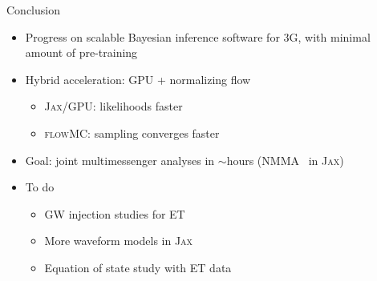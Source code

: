 \documentclass[usenames,dvipsnames,t]{beamer}
\begin{document}
\begin{frame}{Conclusion}
  \def\x{3mm}
  \def\y{2mm}

  \begin{itemize}
    \item Progress on scalable Bayesian inference software for 3G, with minimal amount of pre-training

    \vspace{\x}

    \item Hybrid acceleration: GPU + normalizing flow
    \begin{itemize}
      \item \textsc{Jax}/GPU: likelihoods faster

      \vspace{\y}

      \item \textsc{flowMC}: sampling converges faster
    \end{itemize}

    \vspace{\x}

    \item Goal: joint multimessenger analyses in $\sim$hours (\textsc{NMMA}~\cite{Pang:2022rzc} in \textsc{Jax})

    \vspace{\x}

    \item To do
    \begin{itemize}
      \item  GW injection studies for ET

      \vspace{\y}

      \item More waveform models in \textsc{Jax}

      \vspace{\y}

      \item Equation of state study with ET data
    \end{itemize}
  \end{itemize}
  
  \vspace{4mm}

\end{frame}
\end{document}
